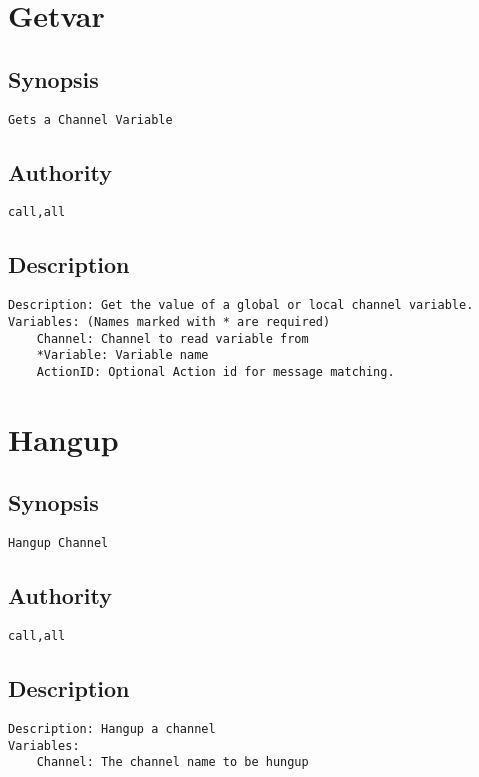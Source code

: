 \section{Getvar}
\subsection{Synopsis}
\begin{verbatim}
Gets a Channel Variable
\end{verbatim}
\subsection{Authority}
\begin{verbatim}
call,all
\end{verbatim}
\subsection{Description}
\begin{verbatim}
Description: Get the value of a global or local channel variable.
Variables: (Names marked with * are required)
	Channel: Channel to read variable from
	*Variable: Variable name
	ActionID: Optional Action id for message matching.

\end{verbatim}


\section{Hangup}
\subsection{Synopsis}
\begin{verbatim}
Hangup Channel
\end{verbatim}
\subsection{Authority}
\begin{verbatim}
call,all
\end{verbatim}
\subsection{Description}
\begin{verbatim}
Description: Hangup a channel
Variables: 
	Channel: The channel name to be hungup

\end{verbatim}


